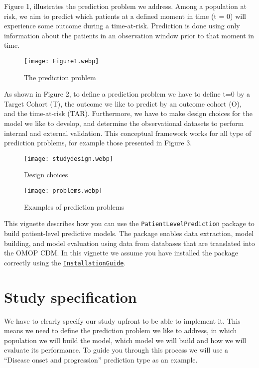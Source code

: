 \documentclass[
]{article}
\begin{document}
Figure 1, illustrates the prediction problem we address. Among a
population at risk, we aim to predict which patients at a defined moment
in time (t = 0) will experience some outcome during a time-at-risk.
Prediction is done using only information about the patients in an
observation window prior to that moment in time.

\begin{figure}
\centering
\texttt{[image: Figure1.webp]}
\caption{The prediction problem}
\end{figure}

As shown in Figure 2, to define a prediction problem we have to define
t=0 by a Target Cohort (T), the outcome we like to predict by an outcome
cohort (O), and the time-at-risk (TAR). Furthermore, we have to make
design choices for the model we like to develop, and determine the
observational datasets to perform internal and external validation. This
conceptual framework works for all type of prediction problems, for
example those presented in Figure 3.

\begin{figure}
\centering
\texttt{[image: studydesign.webp]}
\caption{Design choices}
\end{figure}

\begin{figure}
\centering
\texttt{[image: problems.webp]}
\caption{Examples of prediction problems}
\end{figure}

This vignette describes how you can use the
\texttt{PatientLevelPrediction} package to build patient-level
predictive models. The package enables data extraction, model building,
and model evaluation using data from databases that are translated into
the OMOP CDM. In this vignette we assume you have installed the package
correctly using the
\href{https://github.com/OHDSI/PatientLevelPrediction/blob/main/inst/doc/InstallationGuide.pdf}{\texttt{InstallationGuide}}.

\hypertarget{study-specification}{%
\section{Study specification}\label{study-specification}}

We have to clearly specify our study upfront to be able to implement it.
This means we need to define the prediction problem we like to address,
in which population we will build the model, which model we will build
and how we will evaluate its performance. To guide you through this
process we will use a ``Disease onset and progression'' prediction type
as an example.
\end{document}
